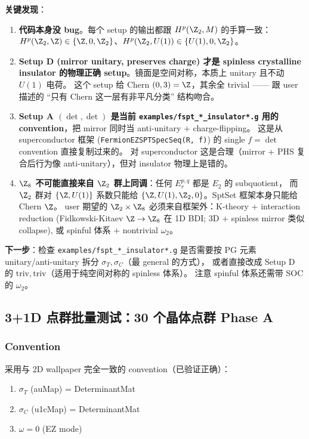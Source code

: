 \documentclass[a4paper,fontset=ubuntu,12pt]{ctexart}
\newcommand{\aT}{\sigma_T}
\newcommand{\aC}{\sigma_C}
\begin{document}
\textbf{关键发现}：

\begin{enumerate}
\item \textbf{代码本身没 bug}。每个 setup 的输出都跟 $H^p(\Z_2, M)$ 的手算一致：
  $H^p(\Z_2, \Z) \in \{\Z, 0, \Z_2\}$、$H^p(\Z_2, U(1)) \in \{U(1), 0, \Z_2\}$。

\item \textbf{Setup D (mirror unitary, preserves charge) 才是 spinless crystalline insulator 的物理正确 setup}。镜面是空间对称，本质上 unitary 且不动 $U(1)$ 电荷。
  这个 setup 给 Chern $(0, 3) = \Z$，其余全 trivial —— 跟 user 描述的 ``只有 Chern 这一层有非平凡分类'' 结构吻合。

\item \textbf{Setup A $(\det, \det)$ 是当前 \texttt{examples/fspt\_*\_insulator*.g} 用的 convention}，把 mirror 同时当 anti-unitary + charge-flipping。
  这是从 superconductor 框架 (\texttt{FermionEZSPTSpecSeq(R, f)}) 的 single $f = \det$ convention 直接复制过来的。
  对 superconductor 这是合理（mirror + PHS 复合后行为像 anti-unitary），但对 insulator 物理上是错的。

\item \textbf{$\Z_8$ 不可能直接来自 $\Z_2$ 群上同调}：任何 $E_r^{p,q}$ 都是 $E_2$ 的 subquotient，
  而 $\Z_2$ 群对 $\{\Z, U(1)\}$ 系数只能给 $\{\Z, U(1), \Z_2, 0\}$。SptSet 框架本身只能给 Chern $\Z$。
  user 期望的 $\Z_2 \times \Z_8$ 必须来自框架外：K-theory + interaction reduction
  (Fidkowski-Kitaev $\Z \to \Z_8$ 在 1D BDI; 3D + spinless mirror 类似 collapse), 或 spinful 体系 + nontrivial $\omega_2$。
\end{enumerate}

\textbf{下一步}：检查 \texttt{examples/fspt\_*\_insulator*.g} 是否需要按 PG 元素 unitary/anti-unitary 拆分 $\aT, \aC$（最 general 的方式），
或者直接改成 Setup D 的 $\mathrm{triv}, \mathrm{triv}$（适用于纯空间对称的 spinless 体系）。
注意 spinful 体系还需带 SOC 的 $\omega_2$。

\subsection{3+1D 点群批量测试：30 个晶体点群 Phase A}

\subsubsection{Convention}

采用与 2D wallpaper 完全一致的 convention（已验证正确）：
\begin{enumerate}
\item $\aT$ (auMap) = DeterminantMat
\item $\aC$ (u1cMap) = DeterminantMat
\item $\omega = 0$ (EZ mode)
\end{enumerate}
\end{document}
